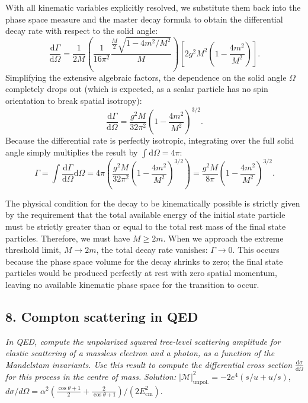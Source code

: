 With all kinematic variables explicitly resolved, we substitute them back into the phase space measure and the master decay formula to obtain the differential decay rate with respect to the solid angle:
\[
    \frac{\mathrm{d} \Gamma}{\mathrm{d} \Omega} = \frac{1}{2M} \left( \frac{1}{16\pi^2} \frac{\frac{M}{2} \sqrt{1 - 4m^2/M^2}}{M} \right) \left[ 2g^2 M^2 \left( 1 - \frac{4m^2}{M^2} \right) \right].
\]
Simplifying the extensive algebraic factors, the dependence on the solid angle \(\Omega\) completely drops out (which is expected, as a scalar particle has no spin orientation to break spatial isotropy):
\[
    \frac{\mathrm{d} \Gamma}{\mathrm{d} \Omega} = \frac{g^2 M}{32\pi^2} \left( 1 - \frac{4m^2}{M^2} \right)^{3/2}.
\]
Because the differential rate is perfectly isotropic, integrating over the full solid angle simply multiplies the result by \( \int \mathrm{d} \Omega = 4\pi \):
\[
    \Gamma = \int \frac{\mathrm{d} \Gamma}{\mathrm{d} \Omega} \mathrm{d} \Omega = 4\pi \left( \frac{g^2 M}{32\pi^2} \left( 1 - \frac{4m^2}{M^2} \right)^{3/2} \right) = \frac{g^2 M}{8\pi} \left( 1 - \frac{4m^2}{M^2} \right)^{3/2}.
\]

\begin{remark}
    The physical condition for the decay to be kinematically possible is strictly given by the requirement that the total available energy of the initial state particle must be strictly greater than or equal to the total rest mass of the final state particles. Therefore, we must have \(M \geq 2m\).
    When we approach the extreme threshold limit, \(M \to 2m\), the total decay rate vanishes: \(\Gamma \to 0\). This occurs because the phase space volume for the decay shrinks to zero; the final state particles would be produced perfectly at rest with zero spatial momentum, leaving no available kinematic phase space for the transition to occur.
\end{remark}


\subsection*{8. Compton scattering in QED}


\begin{center}
    \textit{In QED, compute the unpolarized squared tree-level scattering amplitude for elastic scattering of a massless electron and a photon, as a function of the Mandelstam invariants. Use this result to compute the differential cross section} \(\tfrac{\mathrm{d}\sigma}{\mathrm{d}\Omega}\) \textit{for this process in the centre of mass.}
    \textit{Solution: } \( |\mathcal{M}|_{\text{unpol.}}^2 = -2e^4(s/u + u/s) \), \( d\sigma/d\Omega = \alpha^2 \left( \frac{\cos\theta + 1}{2} + \frac{2}{\cos\theta + 1} \right) / (2E_{\text{cm}}^2) \).
\end{center}

